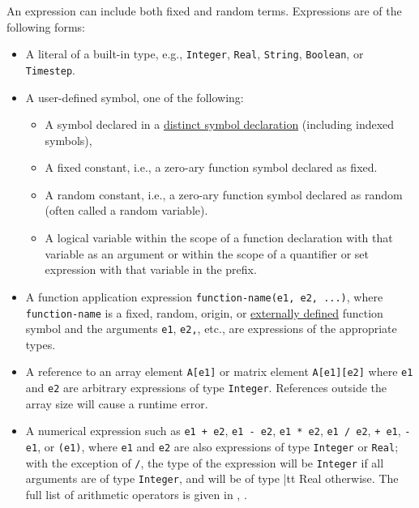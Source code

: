\documentclass[12pt]{article}
\begin{document}
An expression can include both fixed and random terms.  Expressions are of the following forms:
\begin{itemize}
\item A literal of a built-in type, e.g., {\tt Integer}, {\tt Real},
  {\tt String}, {\tt Boolean}, or {\tt Timestep}.
\item A user-defined symbol, one of the following:
\begin{itemize}
\item A symbol declared in a \hyperref[distinct-section]{distinct
  symbol declaration} (including indexed symbols),
\item A fixed constant, i.e., a zero-ary function symbol declared as fixed.
\item A random constant, i.e., a zero-ary function symbol declared as
  random (often called a random variable).
\item A logical variable within the scope of a function declaration
  with that variable as an argument or within the scope of a
  quantifier or set expression with that variable in the prefix.
\end{itemize}
\item A function application expression {\tt function-name(e1, e2,
  ...)}, where {\tt function-name} is a fixed, random, origin, or
  \hyperref[external-function-section]{externally defined} function
  symbol and the arguments {\tt e1}, {\tt e2,}, etc., are
  expressions of the appropriate types.
\item A reference to an array element {\tt A[e1]} or matrix element
  {\tt A[e1][e2]} where {\tt e1} and {\tt e2} are arbitrary
  expressions of type {\tt Integer}.%
  References outside the array size will cause a runtime error.
\item A numerical expression such as \texttt{e1 + e2}, \texttt{e1 - e2},
  \texttt{e1 * e2}, \texttt{e1 / e2},  \texttt{+ e1},
  \texttt{- e1}, or \texttt{(e1)}, 
  where \texttt{e1} and \texttt{e2} are also expressions of
  type \texttt{Integer} or \texttt{Real};
  with the exception of {\tt /}, the type of the expression will be
  {\tt Integer} if all arguments are of type {\tt Integer}, and will
  be of type {|tt Real} otherwise. The full list of arithmetic
  operators is given in , .

\end{itemize}
\end{document}
